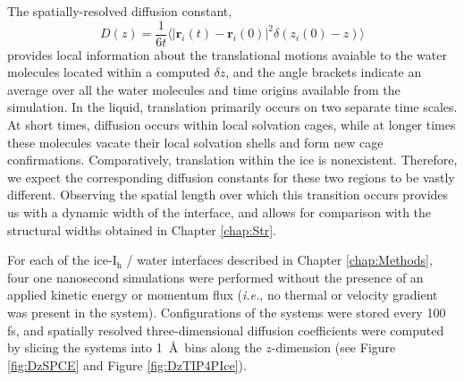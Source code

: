 The spatially-resolved diffusion constant,
\begin{equation}\label{eq:diffusion3}
D(z) = \frac{1}{6t} \langle | \mathbf{r}_i(t) - \mathbf{r}_i(0) |^2
\delta(z_i(0) - z)  \rangle 
\end{equation}
provides local information about the translational motions avaiable to
the water molecules located within a computed $\delta z$, and the
angle brackets indicate an average over all the water molecules and
time origins available from the simulation. In the liquid, translation
primarily occurs on two separate time scales. At short times,
diffusion occurs within local solvation cages, while at longer times
these molecules vacate their local solvation shells and form new cage
confirmations. Comparatively, translation within the ice is
nonexistent. Therefore, we expect the corresponding diffusion
constants for these two regions to be vastly different. Observing the
spatial length over which this transition occurs provides us with a
dynamic width of the interface, and allows for comparison with the
structural widths obtained in Chapter \ref{chap:Str}.

For each of the ice-I$_\mathrm{h}$ / water interfaces described in
Chapter \ref{chap:Methods}, four one nanosecond simulations were
performed without the presence of an applied kinetic energy or
momentum flux (\textit{i.e.}, no thermal or velocity gradient was
present in the system). Configurations of the systems were stored
every 100 fs, and spatially resolved three-dimensional diffusion
coefficients were computed by slicing the systems into 1~\AA~bins
along the $z$-dimension (see Figure \ref{fig:DzSPCE} and Figure
\ref{fig:DzTIP4PIce}).

